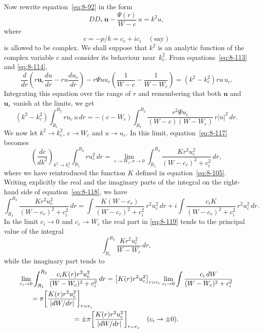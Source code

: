 Now rewrite equation~\eqref{eq:8-92} in the form
\begin{equation}
\label{eq:8-114}
DD_*\,\mathbf{u} - \frac{\Psi(r)}{W-c}\,u = k^2 u,
\end{equation}
where
\begin{equation}
\label{eq:8-115}
c = -p/k = c_r + ic_i \quad (\text{say})
\end{equation}
is allowed to be complex. We shall suppose that $k^2$ is an analytic function of the complex variable $c$ and consider its behaviour near~$k_c^2$. From equations~\eqref{eq:8-113} and \eqref{eq:8-114},
\begin{equation}
\label{eq:8-116}
\frac{d}{dr}\!\left(r\mathbf{u}_c\frac{du}{dr} - ru\frac{du_c}{dr}\right) - r\Psi u u_c\!\left(\frac{1}{W-c} - \frac{1}{W-W_c}\right) = (k^2 - k_c^2)ru\,u_c.
\end{equation}
Integrating this equation over the range of $r$ and remembering that both $\mathbf{u}$ and $\mathbf{u}_c$ vanish at the limits, we get
\begin{equation}
\label{eq:8-117}
(k^2 - k_c^2)\int_{R_1}^{R_2} ru_c\,u\,dr = -(c - W_c)\int_{R_1}^{R_2}\frac{r^2\Psi u_c}{(W-c)(W-W_c)}\,r|u|^2\,dr.
\end{equation}
We now let $k^2 \to k_c^2$, $c \to W_c$ and $u \to u_c$. In this limit, equation~\eqref{eq:8-117} becomes
\begin{equation}
\label{eq:8-118}
\left(\frac{dc}{dk^2}\right)_{k^2\to k_c^2}\int_{R_1}^{R_2} ru_c^2\,dr = \lim_{c\to W_c,\sigma\to 0}\int_{R_1}^{R_2}\frac{Kr^2 u_c^2}{(W-c_r)^2 + c_i^2}\,dr,
\end{equation}
where we have reintroduced the function $K$ defined in equation~\eqref{eq:8-105}. Writing explicitly the real and the imaginary parts of the integral on the right-hand side of equation~\eqref{eq:8-118}, we have
\begin{equation}
\label{eq:8-119}
\int_{R_1}^{R_2}\frac{Kr^2 u_c^2}{(W-c_r)^2 + c_i^2}\,dr = \int\frac{K(W-c_r)}{(W-c_r)^2+c_i^2}\,r^2 u_c^2\,dr + i\int\frac{c_i K}{(W-c_r)^2+c_i^2}\,r^2 u_c^2\,dr.
\end{equation}
In the limit $c_i\to 0$ and $c_r \to W_c$ the real part in \eqref{eq:8-119} tends to the principal value of the integral
\begin{equation}
\label{eq:8-120}
\int_{R_1}^{R_2}\frac{Kr^2 u_c^2}{W - W_c}\,dr,
\end{equation}
while the imaginary part tends to
\begin{multline}
\label{eq:8-121}
\lim_{c_i\to 0}\int_{R_1}^{R_2}\frac{c_i K(r)r^2 u_c^2}{(W-W_c)^2+c_i^2}\,dr = \bigl[K(r)r^2 u_c^2\bigr]_{r=r_c}\lim_{c_i\to 0}\int\frac{c_i\,dW}{(W-W_c)^2+c_i^2} \\
\shoveleft{\quad = \pi\biggl[\frac{K(r)r^2 u_c^2}{|dW/dr|}\biggr]_{r=r_c}}\\
= \pm\pi\biggl[\frac{K(r)r^2 u_c^2}{|dW/dr|}\biggr]_{r=r_c}\quad (c_i\to\pm 0).
\end{multline}
